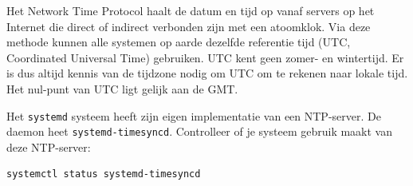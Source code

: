 Het Network Time Protocol haalt de datum en tijd op vanaf servers op het Internet die direct of indirect verbonden zijn met een atoomklok. Via deze methode kunnen alle systemen op aarde dezelfde referentie tijd (UTC, Coordinated Universal Time) gebruiken. UTC kent geen zomer- en wintertijd. Er is dus altijd kennis van de tijdzone nodig om UTC om te rekenen naar lokale tijd. Het nul-punt van UTC ligt gelijk aan de GMT.

Het \texttt{systemd} systeem heeft zijn eigen implementatie van een NTP-server. De daemon heet \texttt{systemd-timesyncd}. Controlleer of je systeem gebruik maakt van deze NTP-server:
\begin{lstlisting}
systemctl status systemd-timesyncd
\end{lstlisting}

